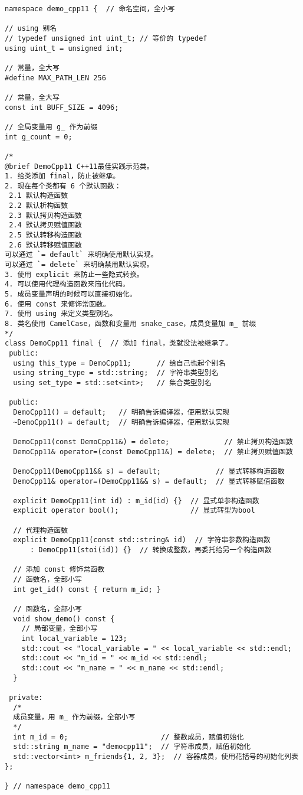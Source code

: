 \begin{verbatim}
namespace demo_cpp11 {  // 命名空间，全小写

// using 别名
// typedef unsigned int uint_t; // 等价的 typedef
using uint_t = unsigned int;

// 常量，全大写
#define MAX_PATH_LEN 256

// 常量，全大写
const int BUFF_SIZE = 4096;

// 全局变量用 g_ 作为前缀
int g_count = 0;

/*
@brief DemoCpp11 C++11最佳实践示范类。
1. 给类添加 final，防止被继承。
2. 现在每个类都有 6 个默认函数：
 2.1 默认构造函数
 2.2 默认析构函数
 2.3 默认拷贝构造函数
 2.4 默认拷贝赋值函数
 2.5 默认转移构造函数
 2.6 默认转移赋值函数
可以通过 `= default` 来明确使用默认实现。
可以通过 `= delete` 来明确禁用默认实现。
3. 使用 explicit 来防止一些隐式转换。
4. 可以使用代理构造函数来简化代码。
5. 成员变量声明的时候可以直接初始化。
6. 使用 const 来修饰常函数。
7. 使用 using 来定义类型别名。
8. 类名使用 CamelCase，函数和变量用 snake_case，成员变量加 m_ 前缀
*/
class DemoCpp11 final {  // 添加 final，类就没法被继承了。
 public:
  using this_type = DemoCpp11;      // 给自己也起个别名
  using string_type = std::string;  // 字符串类型别名
  using set_type = std::set<int>;   // 集合类型别名

 public:
  DemoCpp11() = default;   // 明确告诉编译器，使用默认实现
  ~DemoCpp11() = default;  // 明确告诉编译器，使用默认实现

  DemoCpp11(const DemoCpp11&) = delete;             // 禁止拷贝构造函数
  DemoCpp11& operator=(const DemoCpp11&) = delete;  // 禁止拷贝赋值函数

  DemoCpp11(DemoCpp11&& s) = default;             // 显式转移构造函数
  DemoCpp11& operator=(DemoCpp11&& s) = default;  // 显式转移赋值函数

  explicit DemoCpp11(int id) : m_id(id) {}  // 显式单参构造函数
  explicit operator bool();                 // 显式转型为bool

  // 代理构造函数
  explicit DemoCpp11(const std::string& id)  // 字符串参数构造函数
      : DemoCpp11(stoi(id)) {}  // 转换成整数，再委托给另一个构造函数

  // 添加 const 修饰常函数
  // 函数名，全部小写
  int get_id() const { return m_id; }

  // 函数名，全部小写
  void show_demo() const {
    // 局部变量，全部小写
    int local_variable = 123;
    std::cout << "local_variable = " << local_variable << std::endl;
    std::cout << "m_id = " << m_id << std::endl;
    std::cout << "m_name = " << m_name << std::endl;
  }

 private:
  /*
  成员变量，用 m_ 作为前缀，全部小写
  */
  int m_id = 0;                      // 整数成员，赋值初始化
  std::string m_name = "democpp11";  // 字符串成员，赋值初始化
  std::vector<int> m_friends{1, 2, 3};  // 容器成员，使用花括号的初始化列表
};

} // namespace demo_cpp11
\end{verbatim}

